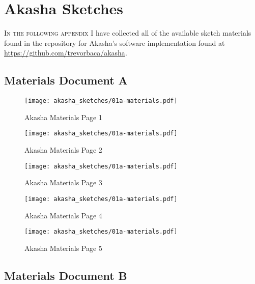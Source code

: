 \chapter{Akasha Sketches}
\label{AppendixD}

\lettrine[lines=2,slope=-2pt,nindent=2pt]{\textcolor{SchoolColor}{I}}{n the following appendix} I have collected all of the available sketch materials found in the repository for Akasha's software implementation found at \url{https://github.com/trevorbaca/akasha}.

\section{Materials Document A}

\begin{figure}[H] %
    \texttt{[image: akasha\_sketches/01a-materials.pdf]}
    \caption{Akasha Materials Page 1}
    \label{fig:akashamaterialsketch-1}
\end{figure}

\begin{figure}[H] %
    \texttt{[image: akasha\_sketches/01a-materials.pdf]}
    \caption{Akasha Materials Page 2}
    \label{fig:akashamaterialsketch-2}
\end{figure}

\begin{figure}[H] %
    \texttt{[image: akasha\_sketches/01a-materials.pdf]}
    \caption{Akasha Materials Page 3}
    \label{fig:akashamaterialsketch-3}
\end{figure}

\begin{figure}[H] %
    \texttt{[image: akasha\_sketches/01a-materials.pdf]}
    \caption{Akasha Materials Page 4}
    \label{fig:akashamaterialsketch-4}
\end{figure}

\begin{figure}[H] %
    \texttt{[image: akasha\_sketches/01a-materials.pdf]}
    \caption{Akasha Materials Page 5}
    \label{fig:akashamaterialsketch-5}
\end{figure}

\section{Materials Document B}

